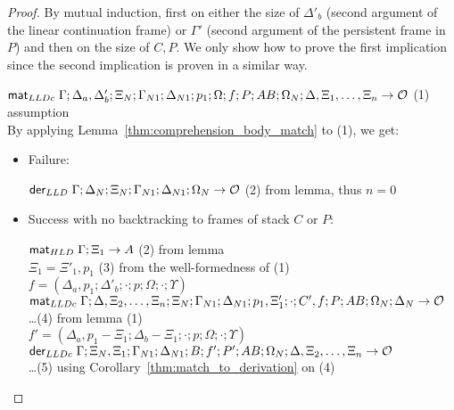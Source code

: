 \begin{proof}

By mutual induction, first on either the size of $\Delta'_b$ (second argument of
the linear continuation frame) or $\Gamma'$ (second argument of the
persistent frame in $P$) and then on the size of $C, P$.  We only show
how to prove the first implication since the second implication is proven
in a similar way.

$\mathsf{mat}_{LLDc} \; \Gamma; \Delta_a, \Delta'_b; \Xi_N; \Gamma_{N1}; \Delta_{N1}; p_1;
\Omega; f; P; AB; \Omega_N; \Delta, \Xi_1, \dotsc, \Xi_n \rightarrow \mathcal{O}$ \hfill (1) assumption\\

By applying Lemma~\ref{thm:comprehension_body_match} to (1), we get:

\begin{itemize}[leftmargin=*]
   \item Failure:
   
   $\mathsf{der}_{LLD} \; \Gamma; \Delta_N; \Xi_N; \Gamma_{N1}; \Delta_{N1}; \Omega_N
   \rightarrow \mathcal{O}$ \hfill (2) from lemma, thus $n = 0$\\
   
   \item Success with no backtracking to frames of stack $C$ or $P$:
   
      $\mathsf{mat}_{HLD} \; \Gamma; \Xi_1 \rightarrow A$ \hfill (2) from lemma \\

      $\Xi_1 = \Xi'_1, p_1$ \hfill (3) from the well-formedness of (1) \\
      $f = (\Delta_a, p_1; \Delta'_b; \cdot; p; \Omega; \cdot; \Upsilon)$ \\

      $\mathsf{mat}_{LLDc} \; \Gamma; \Delta, \Xi_2, \dotsc, \Xi_n; \Xi_N; \Gamma_{N1};
            \Delta_{N1}; p_1, \Xi'_1; \cdot; C', f; P; AB; \Omega_N; \Delta_N \rightarrow
            \mathcal{O}$ \\
      \dots \hfill (4) from lemma (1) \\

      $f' = (\Delta_a, p_1 - \Xi_1; \Delta_b - \Xi_1; \cdot; p; \Omega; \cdot;
            \Upsilon)$ \\

      $\mathsf{der}_{LLDc} \; \Gamma; \Xi_N, \Xi_1; \Gamma_{N1}; \Delta_{N1}; B; f'; P'; AB;
            \Omega_N; \Delta, \Xi_2, \dotsc, \Xi_n \rightarrow \mathcal{O}$ \\
      \dots \hfill (5) using Corollary~\ref{thm:match_to_derivation} on (4) \\


\end{itemize}
\end{proof}
